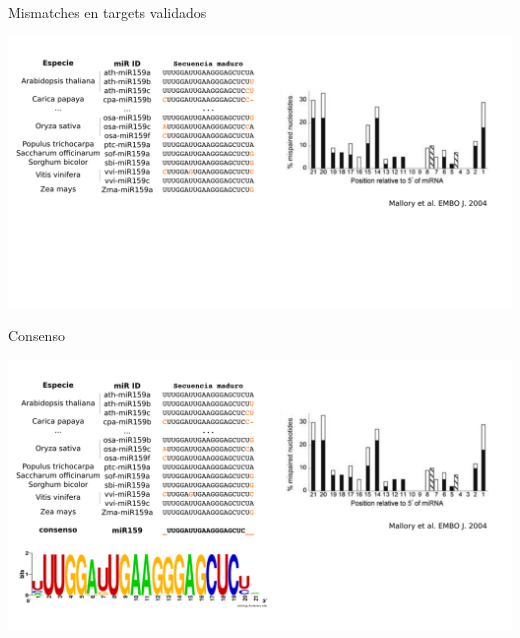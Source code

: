 \documentclass{beamer}
\begin{document}
\begin{frame}{Mismatches en targets validados}
    \begin{center}
{\includegraphics[width=1\textwidth]{img/variacion01.png}}
    \end{center}
\end{frame}

\begin{frame}{Consenso}
    \begin{center}
{\includegraphics[width=1\textwidth]{img/variacion02.png}}
    \end{center}
\end{frame}

\end{document}
